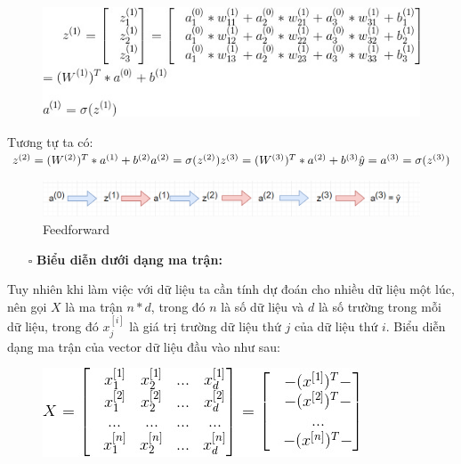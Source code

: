 \FloatBarrier
\begin{figure}[htp]
\begin{center}
\includegraphics[scale=0.8]{chap2/c2_figs/feed_forward.jpg}
\end{center}
\label{fig:feed_forward0}
\end{figure}
\FloatBarrier
Tương tự ta có:
$\newline z^{(2)} = (W^{(2)})^T * a^{(1)} + b^{(2)}\newline  a^{(2)} = \sigma(z^{(2)}) \newline z^{(3)} = (W^{(3)})^T * a^{(2)} + b^{(3)}\newline  \hat{y} = a^{(3)} = \sigma(z^{(3)})$

\FloatBarrier
\begin{figure}[htp]
\begin{center}
\includegraphics[scale=0.75]{chap2/c2_figs/ff.png}
\end{center}
\caption{Feedforward}
\label{fig:feed_forward}
\end{figure}
\FloatBarrier

\begin{itemize}
\item[$\square$] \textbf{Biểu diễn dưới dạng ma trận:}
\end{itemize}
Tuy nhiên khi làm việc với dữ liệu ta cần tính dự đoán cho nhiều dữ liệu một lúc, nên gọi $X$ là ma trận $n*d$, trong đó $n$ là số dữ liệu và $d$ là số trường trong mỗi dữ liệu, trong đó $x_j^{[i]}$ là giá trị trường dữ liệu thứ $j$ của dữ liệu thứ $i$.
Biểu diễn dạng ma trận của vector dữ liệu đầu vào như sau:

\FloatBarrier
\begin{figure}[htp]
\begin{center}
\includegraphics[scale=0.8]{chap2/c2_figs/1.jpg}
\end{center}
\label{fig:feed_forward}
\end{figure}
\FloatBarrier

